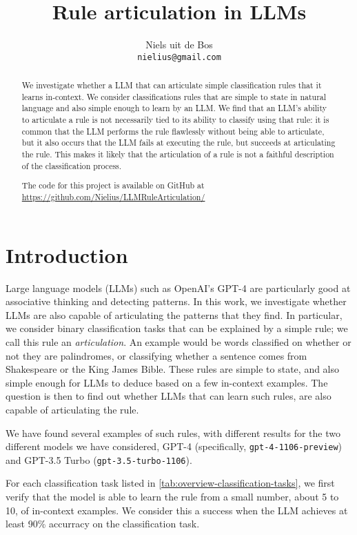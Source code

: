 \documentclass{article}
\title{Rule articulation in LLMs}
\author{%
  Niels uit de Bos \\
  \texttt{nielius@gmail.com} \\
}
\newcommand{\gptf}{GPT-4}
\newcommand{\gptt}{GPT-3.5 Turbo}
\begin{document}
\maketitle


\begin{abstract}
  We investigate whether a LLM that can articulate simple classification rules
  that it learns in-context.
  We consider classifications rules that are simple to state in natural language
  and also simple enough to learn by an LLM.
  We find that an LLM's ability to articulate a rule is not necessarily tied
  to its ability to classify using that rule:
  it is common that the LLM performs the rule flawlessly without being able to articulate,
  but it also occurs that the LLM fails at executing the rule, but succeeds
  at articulating the rule.
  This makes it likely that the articulation of a rule is not a faithful description
  of the classification process.

  The code for this project is available on GitHub at \url{https://github.com/Nielius/LLMRuleArticulation/}
\end{abstract}


\section{Introduction}

Large language models (LLMs) such as OpenAI's GPT-4 are particularly good at associative thinking
and detecting patterns.
In this work, we investigate whether LLMs are also capable of articulating
the patterns that they find.
In particular, we consider binary classification tasks that 
can be explained by a simple rule; we call this rule an \emph{articulation}.
An example would be words classified on whether or not they are palindromes,
or classifying whether a sentence comes from Shakespeare or the King James Bible.
These rules are simple to state, and also simple enough for LLMs to deduce
based on a few in-context examples.
The question is then to find out whether LLMs that can learn such rules,
are also capable of articulating the rule.


We have found several examples of such rules,
with different results for the two different models we have considered,
\gptf{} (specifically, \texttt{gpt-4-1106-preview})
and \gptt{} (\texttt{gpt-3.5-turbo-1106}).

For each classification task listed in \cref{tab:overview-classification-tasks},
we first verify that the model is able to learn the rule from a small number,
about 5 to 10, of in-context examples.
We consider this a success when the LLM achieves at least 90\% accurracy on the classification task.
\end{document}
